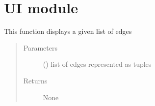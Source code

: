 \documentclass[letterpaper,10pt,english]{sphinxmanual}
\begin{document}
\begin{fulllineitems}

\begin{fulllineitems}
\label{\detokenize{GraphTests:GraphTests.GraphTests.test_remove_edge}}
\end{fulllineitems}


\begin{fulllineitems}
\label{\detokenize{GraphTests:GraphTests.GraphTests.test_remove_vertex}}
\end{fulllineitems}


\begin{fulllineitems}
\label{\detokenize{GraphTests:GraphTests.GraphTests.test_write_graph}}
\end{fulllineitems}


\end{fulllineitems}



\section{UI module}
\label{\detokenize{UI:module-UI}}\label{\detokenize{UI:ui-module}}\label{\detokenize{UI::doc}}

\begin{fulllineitems}
\label{\detokenize{UI:UI.display_edges}}
This function displays a given list of edges
\begin{quote}\begin{description}
\item[{Parameters}] \leavevmode
{} () \textendash{} list of edges represented as tuples

\item[{Returns}] \leavevmode
None

\end{description}\end{quote}

\end{fulllineitems}
\end{document}
